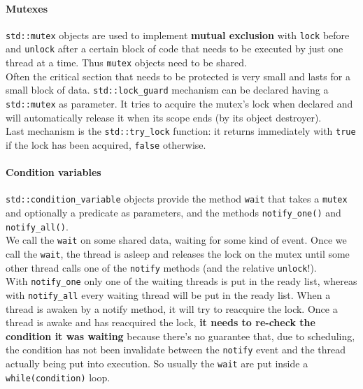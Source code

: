 \documentclass[10pt]{report}
\begin{document}
\paragraph{Mutexes} \texttt{std::mutex} objects are used to implement \textbf{mutual exclusion} with \texttt{lock} before and \texttt{unlock} after a certain block of code that needs to be executed by just one thread at a time. Thus \texttt{mutex} objects need to be shared.\\
Often the critical section that needs to be protected is very small and lasts for a small block of data. \texttt{std::lock\_guard} mechanism can be declared having a \texttt{std::mutex} as parameter. It tries to acquire the mutex's lock when declared and will automatically release it when its scope ends (by its object destroyer).\\
Last mechanism is the \texttt{std::try\_lock} function: it returns immediately with \texttt{true} if the lock has been acquired, \texttt{false} otherwise.
\paragraph{Condition variables} \texttt{std::condition\_variable} objects provide the method \texttt{wait} that takes a \texttt{mutex} and optionally a predicate as parameters, and the methods \texttt{notify\_one()} and \texttt{notify\_all()}.\\
We call the \texttt{wait} on some shared data, waiting for some kind of event. Once we call the \texttt{wait}, the thread is asleep and releases the lock on the mutex until some other thread calls one of the \texttt{notify} methods (and the relative \texttt{unlock}!).\\
With \texttt{notify\_one} only one of the waiting threads is put in the ready list, whereas with \texttt{notify\_all} every waiting thread will be put in the ready list. When a thread is awaken by a notify method, it will try to reacquire the lock. Once a thread is awake and has reacquired the lock, \textbf{it needs to re-check the condition it was waiting} because there's no guarantee that, due to scheduling, the condition has not been invalidate between the \texttt{notify} event and the thread actually being put into execution. So usually the \texttt{wait} are put inside a \texttt{while(condition)} loop.
\end{document}
